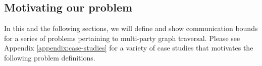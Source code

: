 \subsection{Motivating our problem}

In this and the following sections, we will define and show communication bounds for a series of problems pertaining to multi-party graph traversal. Please see Appendix \ref{appendix:case-studies} for a variety of case studies that motivates the following problem definitions.
